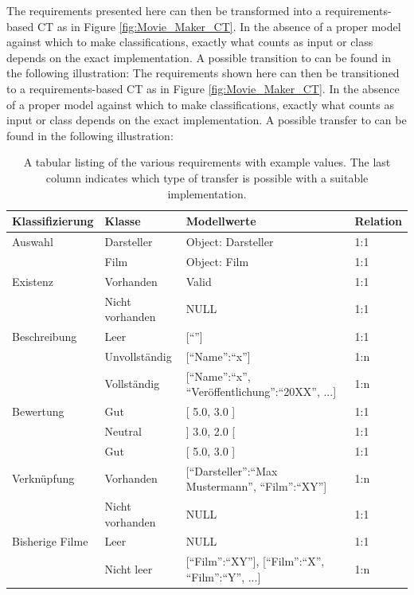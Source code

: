 The requirements presented here can then be transformed into a requirements-based CT as in Figure \ref{fig:Movie_Maker_CT}. In the absence of a proper model against which to make classifications, exactly what counts as input or class depends on the exact implementation. A possible transition to \cite{Conrad} can be found in the following illustration: The requirements shown here can then be transitioned to a requirements-based CT as in Figure \ref{fig:Movie_Maker_CT}. In the absence of a proper model against which to make classifications, exactly what counts as input or class depends on the exact implementation. A possible transfer to \cite{Conrad} can be found in the following illustration:

\begin{table}[t] 
\centering
\begin{small}
\caption{A tabular listing of the various requirements with example values. The last column indicates which type of transfer is possible with a suitable implementation.}
\label{tab:ueberfuehrung}

\setlength{\tabcolsep}{1em}
\begin{tabular}{ p{2.4cm}| p{3cm} |p{5cm} |p{1.3cm} }
	\hline
	\textbf{Klassifizierung} & \textbf{Klasse} & \textbf{Modellwerte} & \textbf{Relation} \\
	\hline	
	Auswahl & Darsteller & Object: Darsteller & 1:1 \\
	\hline
	   & Film & Object: Film & 1:1 \\
	\hline
	Existenz & Vorhanden & Valid & 1:1 \\
	\hline
	   & Nicht vorhanden & NULL & 1:1 \\
	\hline
	Beschreibung & Leer & [\enquote{}] & 1:1 \\
	\hline
	   & Unvollständig & [\enquote{Name}:\enquote{x}] & 1:n \\
	\hline
	   & Vollständig & [\enquote{Name}:\enquote{x}, \enquote{Veröffentlichung}:\enquote{20XX}, ...] & 1:n \\
	\hline
	Bewertung & Gut & [ 5.0, 3.0 ] & 1:1 \\
	\hline
	   & Neutral & ] 3.0, 2.0 [ & 1:1 \\
	\hline 
	   & Gut & [ 5.0, 3.0 ] & 1:1 \\
	\hline 
	Verknüpfung & Vorhanden & [\enquote{Darsteller}:\enquote{Max Mustermann}, \enquote{Film}:\enquote{XY}] & 1:n \\
	\hline 
	   & Nicht vorhanden & NULL & 1:1 \\
	\hline 
	Bisherige Filme & Leer & NULL & 1:1 \\
	\hline 
	   & Nicht leer & [\enquote{Film}:\enquote{XY}], [\enquote{Film}:\enquote{X}, \enquote{Film}:\enquote{Y}, ...] & 1:n \\
	\hline 
\end{tabular}
\end{small}
\end{table}


